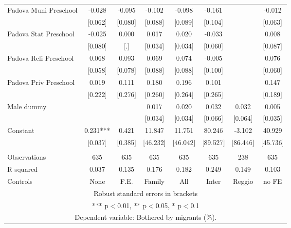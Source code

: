 \begin{tabular}{lccccccc}
Padova Muni Preschool & -0.028 & -0.095 & -0.102 & -0.098 & -0.161 &  & -0.012 \\
 & [0.062] & [0.080] & [0.088] & [0.089] & [0.104] &  & [0.063] \\
Padova Stat Preschool & -0.025 & 0.000 & 0.017 & 0.020 & -0.033 &  & 0.008 \\
 & [0.080] & [.] & [0.034] & [0.034] & [0.060] &  & [0.087] \\
Padova Reli Preschool & 0.068 & 0.093 & 0.069 & 0.074 & -0.005 &  & 0.076 \\
 & [0.058] & [0.078] & [0.088] & [0.088] & [0.100] &  & [0.060] \\
Padova Priv Preschool & 0.019 & 0.111 & 0.180 & 0.196 & 0.101 &  & 0.147 \\
 & [0.222] & [0.276] & [0.260] & [0.264] & [0.265] &  & [0.189] \\
Male dummy &  &  & 0.017 & 0.020 & 0.032 & 0.032 & 0.005 \\
 &  &  & [0.034] & [0.034] & [0.066] & [0.064] & [0.035] \\
Constant & 0.231*** & 0.421 & 11.847 & 11.751 & 80.246 & -3.102 & 40.929 \\
 & [0.037] & [0.385] & [46.232] & [46.042] & [89.527] & [86.446] & [45.736] \\
 &  &  &  &  &  &  &  \\
Observations & 635 & 635 & 635 & 635 & 635 & 238 & 635 \\
R-squared & 0.037 & 0.135 & 0.176 & 0.182 & 0.249 & 0.149 & 0.103 \\
 Controls & None & F.E. & Family & All & Inter & Reggio & no FE \\ \hline
\multicolumn{8}{c}{ Robust standard errors in brackets} \\
\multicolumn{8}{c}{ *** p$<$0.01, ** p$<$0.05, * p$<$0.1} \\
\multicolumn{8}{c}{ Dependent variable: Bothered by migrants (\%).} \\
\end{tabular}
